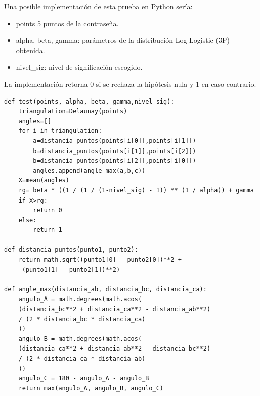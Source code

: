 \documentclass[12pt]{report}
\begin{document}
Una posible implementación de esta prueba en Python sería:




\begin{itemize}
	\item points 5 puntos de la contraseña.
	\item alpha, beta, gamma: parámetros de la distribución Log-Logistic (3P) obtenida.
	\item nivel\_sig: nivel de significación escogido.
	
\end{itemize}
La implementación retorna 0 si se rechaza la hipótesis nula y 1 en caso contrario. 





\begin{lstlisting}
def test(points, alpha, beta, gamma,nivel_sig):
	triangulation=Delaunay(points)
	angles=[]
	for i in triangulation:
		a=distancia_puntos(points[i[0]],points[i[1]])
		b=distancia_puntos(points[i[1]],points[i[2]])
		b=distancia_puntos(points[i[2]],points[i[0]])
		angles.append(angle_max(a,b,c))     
	X=mean(angles) 
	rg= beta * ((1 / (1 / (1-nivel_sig) - 1)) ** (1 / alpha)) + gamma
	if X>rg:
		return 0
	else:
		return 1

def distancia_puntos(punto1, punto2):
	return math.sqrt((punto1[0] - punto2[0])**2 +
	 (punto1[1] - punto2[1])**2)

def angle_max(distancia_ab, distancia_bc, distancia_ca):
	angulo_A = math.degrees(math.acos(
	(distancia_bc**2 + distancia_ca**2 - distancia_ab**2) 
	/ (2 * distancia_bc * distancia_ca)
	))
	angulo_B = math.degrees(math.acos(
	(distancia_ca**2 + distancia_ab**2 - distancia_bc**2) 
	/ (2 * distancia_ca * distancia_ab)
	))
	angulo_C = 180 - angulo_A - angulo_B  
	return max(angulo_A, angulo_B, angulo_C)
\end{lstlisting}
\end{document}

